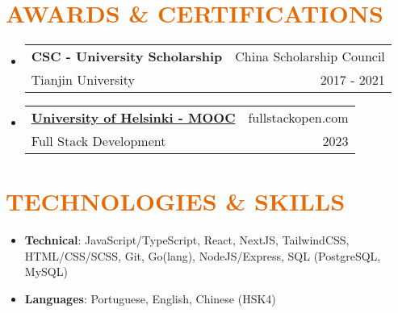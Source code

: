 \documentclass[a4paper, 20pt]{article}
\makeatletter
\newcommand{\resumeItem}[2]{
  \item\small{
    \textbf{#1}{: #2 \vspace{-2pt}}
  }
}
\newcommand{\resumeSubheading}[4]{
  \vspace{-1pt}\item
    \begin{tabular*}{0.97\textwidth}{l@{\extracolsep{\fill}}r}
      \textbf{#1} & #2 \\
      #3 & #4 \\
    \end{tabular*}\vspace{-5pt}
}
\newcommand{\resumeSubItem}[2]{\resumeItem{#1}{#2}\vspace{-3pt}}
\newcommand{\resumeSubHeadingListStart}{\begin{itemize}[leftmargin=*]}
\newcommand{\resumeSubHeadingListEnd}{\end{itemize}}
\makeatother
\begin{document}
\begin{CJK*}{UTF8}{gbsn}
\vspace{5pt}
\section{\textcolor[HTML]{E36C09}{\textbf{AWARDS \& CERTIFICATIONS}}}
\resumeSubHeadingListStart{}
\resumeSubheading{CSC - University Scholarship}{China Scholarship Council}
{Tianjin University}{2017 - 2021}
\resumeSubheading{\href{https://studies.cs.helsinki.fi/stats/api/certificate/fullstackopen/en/c54941f0ecb4d052a3cf6982d1d27398}{University of Helsinki - MOOC}}{fullstackopen.com}
{Full Stack Development}{2023}
\resumeSubHeadingListEnd{}

\vspace{5pt}
\section{\textcolor[HTML]{E36C09}{\textbf{TECHNOLOGIES \& SKILLS}}}
\resumeSubHeadingListStart{}
	  \resumeSubItem{Technical}{\quad JavaScript/TypeScript, React, NextJS, TailwindCSS, HTML/CSS/SCSS, Git, Go(lang), NodeJS/Express, SQL (PostgreSQL, MySQL)}
	  \resumeSubItem{Languages}{\quad Portuguese, English, Chinese (HSK4)}
    \resumeSubHeadingListEnd{}


\vspace{5pt}

\end{CJK*}
\end{document}

